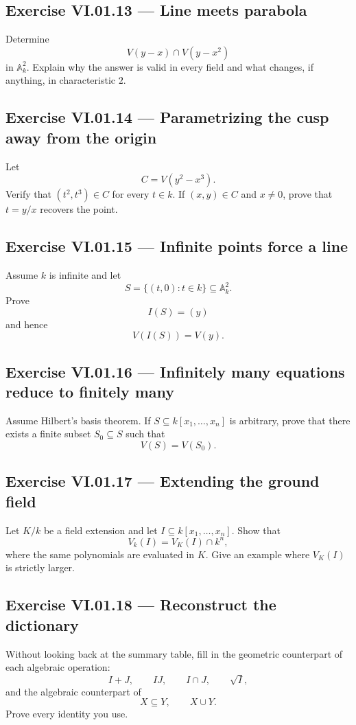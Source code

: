 \subsection*{Exercise VI.01.13 --- Line meets parabola}
\label{ex:vi01-13}
Determine
\[
  V(y-x)\cap V(y-x^2)
\]
in \(\mathbb A_k^2\).  Explain why the answer is valid in every field and what changes,
if anything, in characteristic \(2\).

\subsection*{Exercise VI.01.14 --- Parametrizing the cusp away from the origin}
\label{ex:vi01-14}
Let
\[
  C=V(y^2-x^3).
\]
Verify that \((t^2,t^3)\in C\) for every \(t\in k\).  If \((x,y)\in C\) and
\(x\neq0\), prove that \(t=y/x\) recovers the point.

\subsection*{Exercise VI.01.15 --- Infinite points force a line}
\label{ex:vi01-15}
Assume \(k\) is infinite and let
\[
  S=\{(t,0):t\in k\}\subseteq\mathbb A_k^2.
\]
Prove
\[
  I(S)=(y)
\]
and hence
\[
  V(I(S))=V(y).
\]

\subsection*{Exercise VI.01.16 --- Infinitely many equations reduce to finitely many}
\label{ex:vi01-16}
Assume Hilbert's basis theorem.  If \(S\subseteq k[x_1,\dots,x_n]\) is arbitrary, prove
that there exists a finite subset \(S_0\subseteq S\) such that
\[
  V(S)=V(S_0).
\]

\subsection*{Exercise VI.01.17 --- Extending the ground field}
\label{ex:vi01-17}
Let \(K/k\) be a field extension and let \(I\subseteq k[x_1,\dots,x_n]\).  Show that
\[
  V_k(I)=V_K(I)\cap k^n,
\]
where the same polynomials are evaluated in \(K\).  Give an example where
\(V_K(I)\) is strictly larger.

\subsection*{Exercise VI.01.18 --- Reconstruct the dictionary}
\label{ex:vi01-18}
Without looking back at the summary table, fill in the geometric counterpart of each
algebraic operation:
\[
  I+J,\qquad IJ,\qquad I\cap J,\qquad \sqrt I,
\]
and the algebraic counterpart of
\[
  X\subseteq Y,\qquad X\cup Y.
\]
Prove every identity you use.
